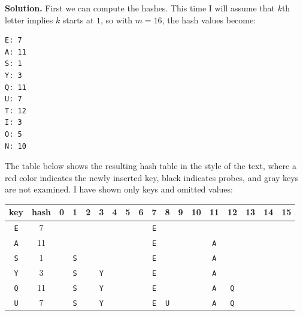 \documentclass[12pt, a4paper]{article}
\newenvironment{sol}[1][Solution]
{\par\medskip\noindent \textbf{#1.} }
{\medskip}
\begin{document}
	\begin{sol}
		First we can compute the hashes. This time I will assume that $k$th letter implies
		$k$ starts at $1$, so with $m=16$, the hash values become:
		
		\begin{lstlisting}[language={}]
E: 7
A: 11
S: 1
Y: 3
Q: 11
U: 7
T: 12
I: 3
O: 5
N: 10
		\end{lstlisting}
		The table below shows the resulting hash table in the style of the text, where
		a red color indicates the newly inserted key, black indicates probes, and gray
		keys are not examined. I have shown only keys and omitted values:
		\begin{center}
			\begin{tabular}{cc|cccccccccccccccc}
				{\color{red} key} & {\color{red} hash} &
				0 & 1 & 2 & 3 & 4 & 5 & 6 & 7 & 8 & 9 & 10 & 11 & 12 & 13 & 14 & 15\\
				\hline
				
				\texttt{E} & 7 &
				{} & {} & {} & {} & {} & {} & {} & {\color{red}\texttt{E}} & {} & {} & {} & {} & {} & {} & {} & {}\\
				
				\texttt{A} & 11 &
				{} & {} & {} & {} & {} & {} & {} & {\color{gray}\texttt{E}} & {} & {} & {} & {\color{red}\texttt{A}} & {} & {} & {} & {}\\
				
				\texttt{S} & 1 &
				{} & {\color{red}\texttt{S}} & {} & {} & {} & {} & {} & {\color{gray}\texttt{E}} & {} & {} & {} & {\color{gray}\texttt{A}} & {} & {} & {} & {}\\
				
				\texttt{Y} & 3 &
				{} & {\color{gray}\texttt{S}} & {} & {\color{red}\texttt{Y}} & {} & {} & {} & {\color{gray}\texttt{E}} & {} & {} & {} & {\color{gray}\texttt{A}} & {} & {} & {} & {}\\
				
				\texttt{Q} & 11 &
				{} & {\color{gray}\texttt{S}} & {} & {\color{gray}\texttt{Y}} & {} & {} & {} & {\color{gray}\texttt{E}} & {} & {} & {} & {\color{black}\texttt{A}} & {\color{red}\texttt{Q}} & {} & {} & {}\\
				
				\texttt{U} & 7 &
				{} & {\color{gray}\texttt{S}} & {} & {\color{gray}\texttt{Y}} & {} & {} & {} & {\color{black}\texttt{E}} & {\color{red}\texttt{U}} & {} & {} & {\color{gray}\texttt{A}} & {\color{gray}\texttt{Q}} & {} & {} & {}\\
				

\end{tabular}
\end{center}
\end{sol}
\end{document}
